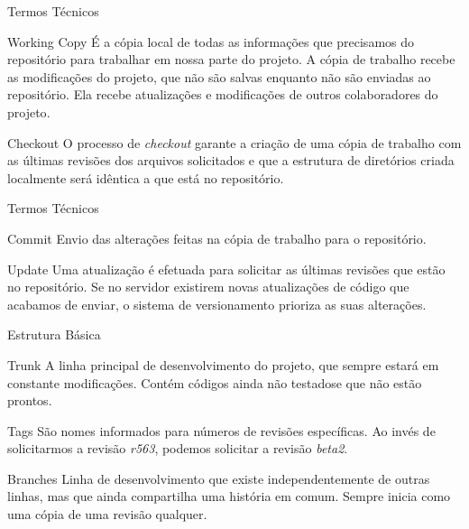 \documentclass[hyperref={pdfpagelabels=false}]{beamer}
\begin{document}
\begin{frame}{Termos Técnicos}
    \begin{block}{Working Copy}
        É a cópia local de todas as informações que precisamos do repositório
        para trabalhar em nossa parte do projeto. A cópia de trabalho recebe as
        modificações do projeto, que não são salvas enquanto não são enviadas ao
        repositório. Ela recebe atualizações e modificações de outros
        colaboradores do projeto\cite{mason2005}.
    \end{block}
    \pause{}
    \begin{block}{Checkout}
        O processo de \textit{checkout} garante a criação de uma cópia de
        trabalho com as últimas revisões dos arquivos solicitados e que a
        estrutura de diretórios criada localmente será idêntica a que está no
        repositório\cite{mason2005}.
    \end{block}
\end{frame}

\begin{frame}{Termos Técnicos}
    \begin{block}{Commit}
        Envio das alterações feitas na cópia de trabalho para o repositório.
    \end{block}
    \pause{}
    \begin{block}{Update}
        Uma atualização é efetuada para solicitar as últimas revisões que estão
        no repositório. Se no servidor existirem novas atualizações de código
        que acabamos de enviar, o sistema de versionamento prioriza as suas
        alterações.
    \end{block}
\end{frame}

\begin{frame}{Estrutura Básica}
    \begin{block}{Trunk}
        A linha principal de desenvolvimento do projeto, que sempre estará em
        constante modificações\cite{mason2005}. Contém códigos ainda não
        testadose que não estão prontos.
    \end{block}
    \pause{}
    \begin{block}{Tags}
        São nomes informados para números de revisões específicas. Ao invés de
        solicitarmos a revisão \textit{r563}, podemos solicitar a revisão
        \textit{beta2}.
    \end{block}
    \pause{}
    \begin{block}{Branches}
        Linha de desenvolvimento que existe independentemente de outras linhas,
        mas que ainda compartilha uma história em comum\cite{sussman2007}.
        Sempre inicia como uma cópia de uma revisão qualquer.
    \end{block}
\end{frame}
\end{document}
